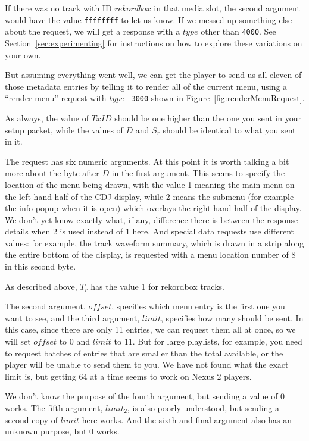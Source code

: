 \documentclass[11pt]{article}
\begin{document}
If there was no track with ID $rekordbox$ in that media slot, the
second argument would have the value {\tt ffffffff} to let us know. If
we messed up something else about the request, we will get a response
with a $type$ other than {\tt 4000}. See
Section~\ref{sec:experimenting} for instructions on how to explore
these variations on your own.

But assuming everything went well, we can get the player to send us
all eleven of those metadata entries by telling it to render all of
the current menu, using a ``render menu'' request with $type$ {\tt
  3000} shown in Figure~\ref{fig:renderMenuRequest}.

As always, the value of $TxID$ should be one higher than the one you
sent in your setup packet, while the values of $D$ and $S_r$ should be
identical to what you sent in it.

The request has six numeric arguments. At this point it is worth
talking a bit more about the byte after $D$ in the first argument.
This seems to specify the location of the menu being drawn, with the
value 1 meaning the main menu on the left-hand half of the CDJ
display, while 2 means the submenu (for example the info popup when it
is open) which overlays the right-hand half of the display. We don't
yet know exactly what, if any, difference there is between the
response details when 2 is used instead of 1 here. And special data
requests use different values: for example, the track waveform
summary, which is drawn in a strip along the entire bottom of the
display, is requested with a menu location number of 8 in this second
byte.

As described above, $T_r$ has the value 1 for rekordbox tracks.

The second argument, $offset$, specifies which menu entry is the first
one you want to see, and the third argument, $limit$, specifies how
many should be sent. In this case, since there are only 11 entries, we
can request them all at once, so we will set $offset$ to 0 and $limit$
to 11. But for large playlists, for example, you need to request
batches of entries that are smaller than the total available, or the
player will be unable to send them to you. We have not found what the
exact limit is, but getting 64 at a time seems to work on Nexus 2
players.

We don't know the purpose of the fourth argument, but sending a value
of 0 works. The fifth argument, $limit_2$, is also poorly understood,
but sending a second copy of $limit$ here works. And the sixth and
final argument also has an unknown purpose, but 0 works.
\end{document}
